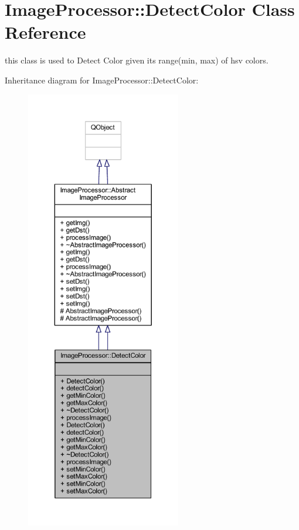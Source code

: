 \hypertarget{class_image_processor_1_1_detect_color}{}\section{Image\+Processor\+:\+:Detect\+Color Class Reference}
\label{class_image_processor_1_1_detect_color}


this class is used to Detect Color given it\textquotesingle{}s range(min, max) of hsv colors.  




Inheritance diagram for Image\+Processor\+:\+:Detect\+Color\+:\nopagebreak
\begin{figure}[H]
\begin{center}
\leavevmode
\includegraphics[height=550pt]{d2/d7f/class_image_processor_1_1_detect_color__inherit__graph}
\end{center}
\end{figure}


